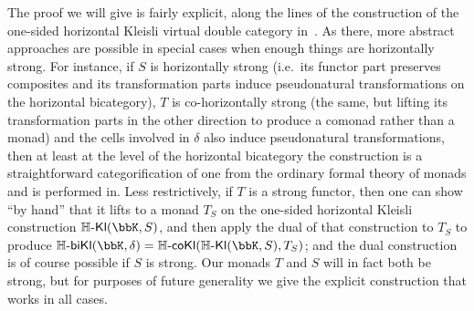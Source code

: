 \documentclass{amsart}
\newcommand{\K}{\bbK}
\newcommand{\Hkl}[2]{\mathbb{H}\text{-}\mathsf{Kl}(#1,#2)}
\newcommand{\Hcokl}[2]{\mathbb{H}\text{-}\mathsf{coKl}(#1,#2)}
\newcommand{\Hbikl}[2]{\mathbb{H}\text{-}\mathsf{biKl}(#1,#2)}
\begin{document}

The proof we will give is fairly explicit, along the lines of the construction of the one-sided horizontal Kleisli virtual double category in~\cite{cs:multicats}.
As there, more abstract approaches are possible in special cases when enough things are horizontally strong.
For instance, if $S$ is horizontally strong (i.e.\ its functor part preserves composites and its transformation parts induce pseudonatural transformations on the horizontal bicategory), $T$ is co-horizontally strong (the same, but lifting its transformation parts in the other direction to produce a comonad rather than a monad) and the cells involved in $\delta$ also induce pseudonatural transformations, then at least at the level of the horizontal bicategory the construction is a straightforward categorification of one from the ordinary formal theory of monads and is performed in\cite{garner:polycats}.
Less restrictively, if $T$ is a strong functor, then one can show ``by hand'' that it lifts to a monad $T_S$ on the one-sided horizontal Kleisli construction $\Hkl\K S$, and then apply the dual of that construction to $T_S$ to produce $\Hbikl\K\delta = \Hcokl{\Hkl{\K}{S}}{T_S}$; and the dual construction is of course possible if $S$ is strong.
Our monads $T$ and $S$ will in fact both be strong, but for purposes of future generality we give the explicit construction that works in all cases.
\end{document}
